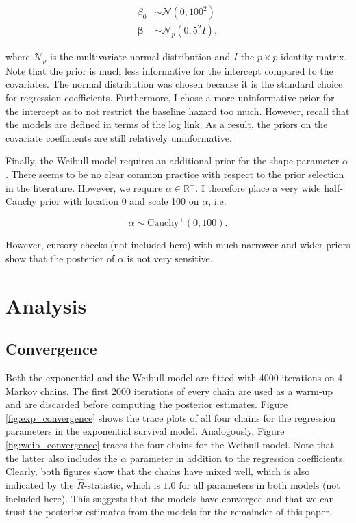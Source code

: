 \documentclass[11pt]{article}
\begin{document}
\begin{align*}
    \beta_0 &\sim \mathcal{N}(0, 100^2) \\
    \bm{\beta} &\sim \mathcal{N}_{p}(0, 5^2I),
\end{align*}

where $\mathcal{N}_p$ is the multivariate normal distribution and $I$ the $p\times p$ identity matrix. Note that the prior is much less informative for the intercept compared to the covariates. The normal distribution was chosen because it is the standard choice for regression coefficients. Furthermore, I chose a more uninformative prior for the intercept as to not restrict the baseline hazard too much. However, recall that the models are defined in terms of the log link. As a result, the priors on the covariate coefficients are still relatively uninformative.

Finally, the Weibull model requires an additional prior for the shape parameter $\alpha$. There seems to be no clear common practice with respect to the prior selection in the literature. However, we require $\alpha \in \mathbb{R}^+$. I therefore place a very wide half-Cauchy prior with location 0 and scale 100 on $\alpha$, i.e. 

$$
\alpha \sim \text{Cauchy}^+(0, 100). 
$$

However, cursory checks (not included here) with much narrower and wider priors show that the posterior of $\alpha$ is not very sensitive. 

\section{Analysis}
\subsection{Convergence}
Both the exponential and the Weibull model are fitted with 4000 iterations on 4 Markov chains. The first 2000 iterations of every chain are used as a warm-up and are discarded before computing the posterior estimates. Figure \ref{fig:exp_convergence} shows the trace plots of all four chains for the regression parameters in the exponential survival model. Analogously, Figure \ref{fig:weib_convergence} traces the four chains for the Weibull model. Note that the latter also includes the $\alpha$ parameter in addition to the regression coefficients. Clearly, both figures show that the chains have mixed well, which is also indicated by the $\hat{R}$-statistic, which is $1.0$ for all parameters in both models (not included here). This suggests that the models have converged and that we can trust the posterior estimates from the models for the remainder of this paper. 
\end{document}
